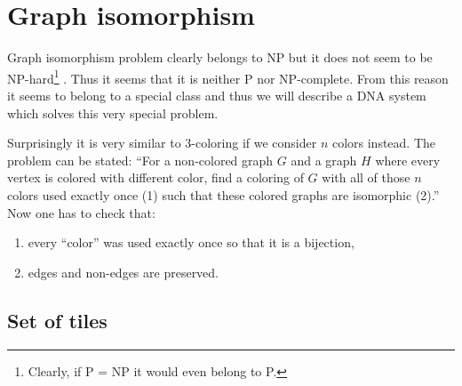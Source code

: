 \section{Graph isomorphism}

Graph isomorphism problem clearly belongs to NP but it does not seem to be NP-hard\footnote{Clearly, if P = NP it would even belong to P.} \cite{borec_z_wiki}. Thus it seems that it is neither P nor NP-complete. From this reason it seems to belong to a special class and thus we will describe a DNA system which solves this very special problem. %

Surprisingly it is very similar to 3-coloring if we consider $n$ colors instead. The problem can be stated: ``For a non-colored graph $G$ and a graph $H$ where every vertex is colored with different color, find a coloring of $G$ with all of those $n$ colors used exactly once (1) such that these colored graphs are isomorphic (2).'' Now one has to check that:
\begin{enumerate}
	\item every ``color'' was used exactly once so that it is a bijection,
	\item edges and non-edges are preserved.
\end{enumerate}

\subsection*{Set of tiles}

